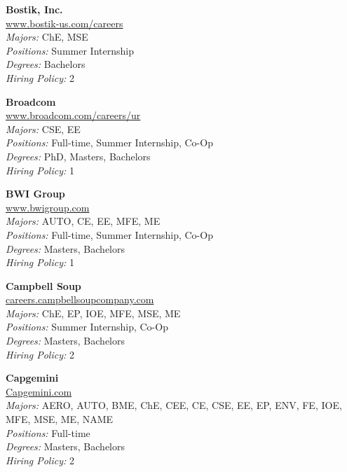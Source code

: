 \documentclass[twoside]{article}
\begin{document}
\begin{center}
\begin{multicols}{3}
\begin{minipage}{.9\columnwidth}{\Large\bf Bostik, Inc. }\\
	\url{www.bostik-us.com/careers}\\
	\emph{Majors:} ChE, MSE\\
	\emph{Positions:} Summer Internship\\
	\emph{Degrees:} Bachelors\\
	\emph{Hiring Policy:} 2\\
\end{minipage}
 
\begin{minipage}{.9\columnwidth}{\Large\bf Broadcom }\\
	\url{www.broadcom.com/careers/ur}\\
	\emph{Majors:} CSE, EE\\
	\emph{Positions:} Full-time, Summer Internship, Co-Op\\
	\emph{Degrees:} PhD, Masters, Bachelors\\
	\emph{Hiring Policy:} 1\\
\end{minipage}
 
\begin{minipage}{.9\columnwidth}{\Large\bf BWI Group }\\
	\url{www.bwigroup.com}\\
	\emph{Majors:} AUTO, CE, EE, MFE, ME\\
	\emph{Positions:} Full-time, Summer Internship, Co-Op\\
	\emph{Degrees:} Masters, Bachelors\\
	\emph{Hiring Policy:} 1\\
\end{minipage}
 
\begin{minipage}{.9\columnwidth}{\Large\bf Campbell Soup }\\
	\url{careers.campbellsoupcompany.com}\\
	\emph{Majors:} ChE, EP, IOE, MFE, MSE, ME\\
	\emph{Positions:} Summer Internship, Co-Op\\
	\emph{Degrees:} Masters, Bachelors\\
	\emph{Hiring Policy:} 2\\
\end{minipage}
 
\begin{minipage}{.9\columnwidth}{\Large\bf Capgemini }\\
	\url{Capgemini.com}\\
	\emph{Majors:} AERO, AUTO, BME, ChE, CEE, CE, CSE, EE, EP, ENV, FE, IOE, MFE, MSE, ME, NAME\\
	\emph{Positions:} Full-time\\
	\emph{Degrees:} Masters, Bachelors\\
	\emph{Hiring Policy:} 2\\
\end{minipage}
 

\end{multicols}
\end{center}
\end{document}
